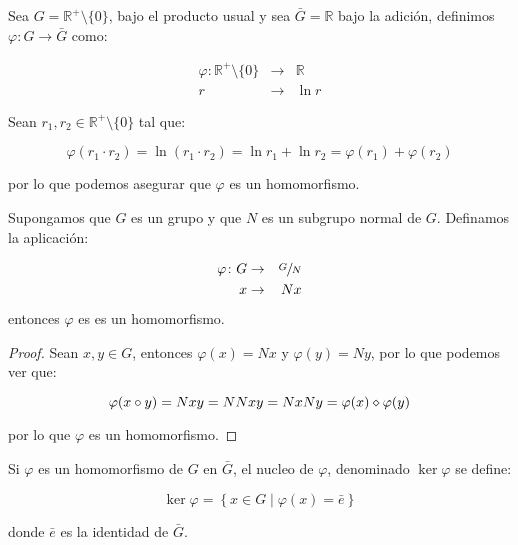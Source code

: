         \begin{ejemplo}
            Sea $G = \mathbb{R}^+ \setminus \{0\}$, bajo el producto usual y sea $\bar{G} = \mathbb{R}$ bajo la adición, definimos $\varphi \colon G \to \bar{G}$ como:

            \begin{eqnarray*}
                \varphi \colon \mathbb{R}^+ \setminus \{0\} & \to & \mathbb{R} \\
                r & \to & \ln{r}
            \end{eqnarray*}

            Sean $r_1, r_2 \in \mathbb{R}^+ \setminus \{0\}$ tal que:

            \begin{equation*}
                \varphi(r_1 \cdot r_2) = \ln{(r_1 \cdot r_2)} = \ln{r_1} + \ln{r_2} = \varphi(r_1) + \varphi(r_2)
            \end{equation*}

            por lo que podemos asegurar que $\varphi$ es un homomorfismo.
        \end{ejemplo}

        \begin{lema}
            Supongamos que $G$ es un grupo y que $N$ es un subgrupo normal de $G$. Definamos la aplicación:

            \begin{eqnarray*}
                \varphi \colon G & \to & \sfrac{G}{N} \\
                x & \to & Nx
            \end{eqnarray*}

            entonces $\varphi$ es es un homomorfismo.
        \end{lema}

        \begin{proof}
            Sean $x, y \in G$, entonces $\varphi(x) = Nx$ y $\varphi(y) = Ny$, por lo que podemos ver que:

            \begin{equation*}
                \varphi(x \circ y) = Nxy = NNxy = NxNy = \varphi(x) \diamond \varphi(y)
            \end{equation*}

            por lo que $\varphi$ es un homomorfismo.
        \end{proof}

        \begin{definicion}
            Si $\varphi$ es un homomorfismo de $G$ en $\bar{G}$, el nucleo de $\varphi$, denominado $\ker{\varphi}$ se define:

            \begin{equation}
                \ker{\varphi} = \left\{ x \in G \mid \varphi(x) = \bar{e} \right\}
            \end{equation}

            donde $\bar{e}$ es la identidad de $\bar{G}$.
        \end{definicion}

